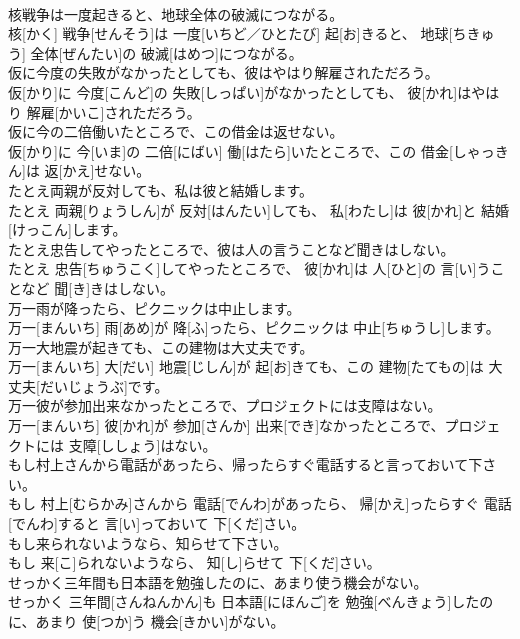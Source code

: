 \documentclass[8pt]{extreport}
\begin{document}
\begin{CJK}{UTF8}{min}
\\	核戦争は一度起きると、地球全体の破滅につながる。	
\\	核[かく] 戦争[せんそう]は 一度[いちど／ひとたび] 起[お]きると、 地球[ちきゅう] 全体[ぜんたい]の 破滅[はめつ]につながる。
\\	仮に今度の失敗がなかったとしても、彼はやはり解雇されただろう。	
\\	仮[かり]に 今度[こんど]の 失敗[しっぱい]がなかったとしても、 彼[かれ]はやはり 解雇[かいこ]されただろう。
\\	仮に今の二倍働いたところで、この借金は返せない。	
\\	仮[かり]に 今[いま]の 二倍[にばい] 働[はたら]いたところで、この 借金[しゃっきん]は 返[かえ]せない。
\\	たとえ両親が反対しても、私は彼と結婚します。	
\\	たとえ 両親[りょうしん]が 反対[はんたい]しても、 私[わたし]は 彼[かれ]と 結婚[けっこん]します。
\\	たとえ忠告してやったところで、彼は人の言うことなど聞きはしない。	
\\	たとえ 忠告[ちゅうこく]してやったところで、 彼[かれ]は 人[ひと]の 言[い]うことなど 聞[き]きはしない。
\\	万一雨が降ったら、ピクニックは中止します。	
\\	万一[まんいち] 雨[あめ]が 降[ふ]ったら、ピクニックは 中止[ちゅうし]します。
\\	万一大地震が起きても、この建物は大丈夫です。	
\\	万一[まんいち] 大[だい] 地震[じしん]が 起[お]きても、この 建物[たてもの]は 大丈夫[だいじょうぶ]です。
\\	万一彼が参加出来なかったところで、プロジェクトには支障はない。	
\\	万一[まんいち] 彼[かれ]が 参加[さんか] 出来[でき]なかったところで、プロジェクトには 支障[ししょう]はない。
\\	もし村上さんから電話があったら、帰ったらすぐ電話すると言っておいて下さい。	
\\	もし 村上[むらかみ]さんから 電話[でんわ]があったら、 帰[かえ]ったらすぐ 電話[でんわ]すると 言[い]っておいて 下[くだ]さい。
\\	もし来られないようなら、知らせて下さい。	
\\	もし 来[こ]られないようなら、 知[し]らせて 下[くだ]さい。
\\	せっかく三年間も日本語を勉強したのに、あまり使う機会がない。	
\\	せっかく 三年間[さんねんかん]も 日本語[にほんご]を 勉強[べんきょう]したのに、あまり 使[つか]う 機会[きかい]がない。

\end{CJK}
\end{document}
